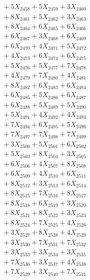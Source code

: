 \documentclass[a4paper,10pt]{article}
\begin{document}
{\begin{align}
&\;  + 5 X_{2458} + 5 X_{2459} + 3 X_{2460} \\[0.3ex]
&\;  + 8 X_{2461} + 5 X_{2462} + 3 X_{2463} \\[0.3ex]
&\;  + 8 X_{2464} + 6 X_{2465} + 6 X_{2466} \\[0.3ex]
&\;  + 6 X_{2467} + 3 X_{2468} + 6 X_{2469} \\[0.5ex]\allowbreak
&\;  + 6 X_{2470} + 4 X_{2471} + 5 X_{2472} \\[0.3ex]
&\;  + 4 X_{2473} + 6 X_{2474} + 6 X_{2475} \\[0.3ex]
&\;  + 5 X_{2476} + 5 X_{2477} + 7 X_{2478} \\[0.3ex]
&\;  + 4 X_{2479} + 7 X_{2480} + 4 X_{2481} \\[0.3ex]
&\;  + 8 X_{2482} + 6 X_{2483} + 6 X_{2484} \\[0.3ex]
&\;  + 6 X_{2485} + 5 X_{2486} + 6 X_{2487} \\[0.3ex]
&\;  + 6 X_{2488} + 5 X_{2489} + 5 X_{2490} \\[0.3ex]
&\;  + 5 X_{2491} + 4 X_{2492} + 4 X_{2493} \\[0.3ex]
&\;  + 7 X_{2494} + 6 X_{2495} + 5 X_{2496} \\[0.3ex]
&\;  + 7 X_{2497} + 7 X_{2498} + 7 X_{2499} \\[0.5ex]\allowbreak
&\;  + 3 X_{2500} + 5 X_{2501} + 6 X_{2502} \\[0.3ex]
&\;  + 5 X_{2503} + 8 X_{2504} + 3 X_{2505} \\[0.3ex]
&\;  + 6 X_{2506} + 4 X_{2507} + 8 X_{2508} \\[0.3ex]
&\;  + 6 X_{2509} + 4 X_{2510} + 6 X_{2511} \\[0.3ex]
&\;  + 8 X_{2512} + 3 X_{2513} + 6 X_{2514} \\[0.3ex]
&\;  + 8 X_{2515} + 7 X_{2516} + 8 X_{2517} \\[0.3ex]
&\;  + 8 X_{2518} + 6 X_{2519} + 3 X_{2520} \\[0.3ex]
&\;  + 8 X_{2521} + 8 X_{2522} + 3 X_{2523} \\[0.3ex]
&\;  + 8 X_{2524} + 7 X_{2525} + 4 X_{2526} \\[0.3ex]
&\;  + 3 X_{2527} + 8 X_{2528} + 4 X_{2529} \\[0.5ex]\allowbreak
&\;  + 3 X_{2530} + 7 X_{2531} + 7 X_{2532} \\[0.3ex]
&\;  + 3 X_{2533} + 3 X_{2534} + 3 X_{2535} \\[0.3ex]
&\;  + 7 X_{2536} + 3 X_{2537} + 4 X_{2538} \\[0.3ex]
&\;  + 7 X_{2539} + 3 X_{2540} + 7 X_{2541} \\[0.3ex]

\end{align}}
\end{document}
